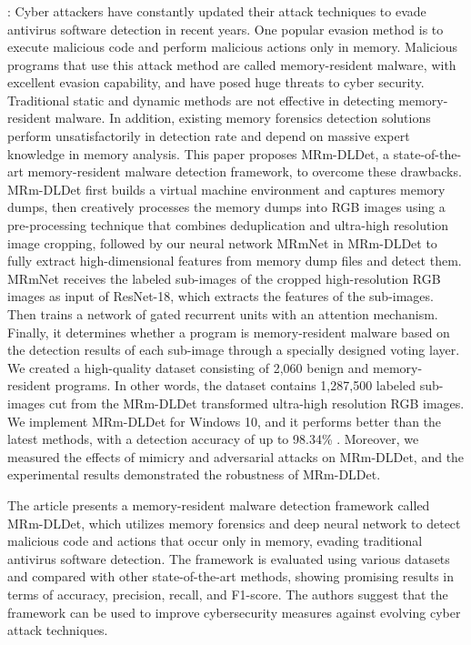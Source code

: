 \documentclass{article}
\begin{document}
\subsubsection{\textcite{Liu:2023}}
\textbf{}:  Cyber attackers have constantly updated their attack techniques to evade antivirus software detection in recent years. One popular evasion method is to execute malicious code and perform malicious actions only in memory. Malicious programs that use this attack method are called memory-resident malware, with excellent evasion capability, and have posed huge threats to cyber security. Traditional static and dynamic methods are not effective in detecting memory-resident malware. In addition, existing memory forensics detection solutions perform unsatisfactorily in detection rate and depend on massive expert knowledge in memory analysis. This paper proposes MRm-DLDet, a state-of-the-art memory-resident malware detection framework, to overcome these drawbacks. MRm-DLDet first builds a virtual machine environment and captures memory dumps, then creatively processes the memory dumps into RGB images using a pre-processing technique that combines deduplication and ultra-high resolution image cropping, followed by our neural network MRmNet in MRm-DLDet to fully extract high-dimensional features from memory dump files and detect them. MRmNet receives the labeled sub-images of the cropped high-resolution RGB images as input of ResNet-18, which extracts the features of the sub-images. Then trains a network of gated recurrent units with an attention mechanism. Finally, it determines whether a program is memory-resident malware based on the detection results of each sub-image through a specially designed voting layer. We created a high-quality dataset consisting of 2,060 benign and memory-resident programs. In other words, the dataset contains 1,287,500 labeled sub-images cut from the MRm-DLDet transformed ultra-high resolution RGB images. We implement MRm-DLDet for Windows 10, and it performs better than the latest methods, with a detection accuracy of up to 98.34\% . Moreover, we measured the effects of mimicry and adversarial attacks on MRm-DLDet, and the experimental results demonstrated the robustness of MRm-DLDet.

The article presents a memory-resident malware detection framework called MRm-DLDet, which utilizes memory forensics and deep neural network to detect malicious code and actions that occur only in memory, evading traditional antivirus software detection. The framework is evaluated using various datasets and compared with other state-of-the-art methods, showing promising results in terms of accuracy, precision, recall, and F1-score. The authors suggest that the framework can be used to improve cybersecurity measures against evolving cyber attack techniques.
\end{document}
